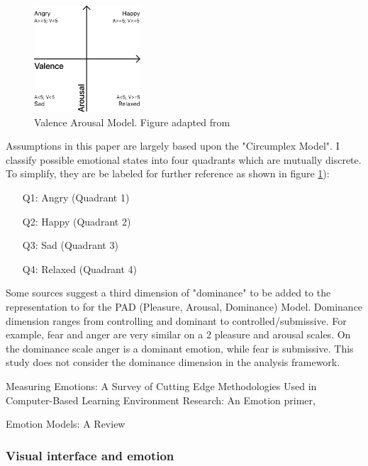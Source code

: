 		\begin{figure}[t]
			\begin{center}
				\includegraphics[width=150px]{graphics/Valence-Arousal-Model-0.png}
				\caption{Valence Arousal Model. Figure adapted from \cite{Song2013} \label{fig:valence_arousal_model}}
				
			\end{center}
		\end{figure}
	
		Assumptions in this paper are largely based upon the "Circumplex Model". I classify possible emotional states into four quadrants which are mutually discrete. To simplify, they are be labeled for further reference as shown in figure \ref{fig:valence_arousal_model}):
		\begin{enumerate}
			\item[Q1:] Angry 	(Quadrant 1)
			\item[Q2:] Happy 	(Quadrant 2)
			\item[Q3:] Sad 		(Quadrant 3)
			\item[Q4:] Relaxed 	(Quadrant 4)
		\end{enumerate}
		
		Some sources suggest a third dimension of "dominance" to be added to the representation to for the PAD (Pleasure, Arousal, Dominance) Model. Dominance dimension ranges from controlling and dominant to controlled/submissive. For example, fear and anger are very similar on a 2 pleasure and arousal scales. On the dominance scale anger is a dominant emotion, while fear is submissive. \cite{Mehrabian1974}
		This study does not consider the dominance dimension in the analysis framework. 
		
		\cite{Harley2016} Measuring Emotions: A Survey of Cutting Edge Methodologies Used in Computer-Based Learning Environment Research: An Emotion primer, 
		
		\cite{SreejaPSMahalakshmi2017} Emotion Models: A Review
		
		
		
		\subsubsection{Visual interface and emotion}
		
